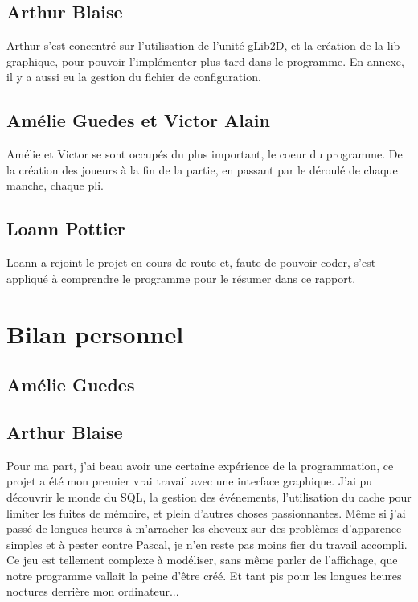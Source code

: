 \documentclass[12pt]{report}
\begin{document}
\subsection*{Arthur Blaise}
	Arthur s'est concentré sur l'utilisation de l'unité gLib2D, et la création de la lib graphique, pour pouvoir l'implémenter plus tard dans le programme. En annexe, il y a aussi eu la gestion du fichier de configuration.
	
\subsection*{Amélie Guedes et Victor Alain}
 Amélie et Victor se sont occupés du plus important, le coeur du programme. De la création des joueurs à la fin de la partie, en passant par le déroulé de chaque manche, chaque pli. 
 
\subsection*{Loann Pottier}
Loann a rejoint le projet en cours de route et, faute de pouvoir coder, s'est appliqué à comprendre le programme pour le résumer dans ce rapport.


\vspace{15pt}
\section{Bilan personnel}
\subsection{Amélie Guedes}

\subsection{Arthur Blaise}
Pour ma part, j'ai beau avoir une certaine expérience de la programmation, ce projet a été mon premier vrai travail avec une interface graphique. J'ai pu découvrir le monde du SQL, la gestion des événements, l'utilisation du cache pour limiter les fuites de mémoire, et plein d'autres choses passionnantes. Même si j'ai passé de longues heures à m'arracher les cheveux sur des problèmes d'apparence simples et à pester contre Pascal, je n'en reste pas moins fier du travail accompli. Ce jeu est tellement complexe à modéliser, sans même parler de l'affichage, que notre programme vallait la peine d'être créé. Et tant pis pour les longues heures noctures derrière mon ordinateur...
\end{document}
